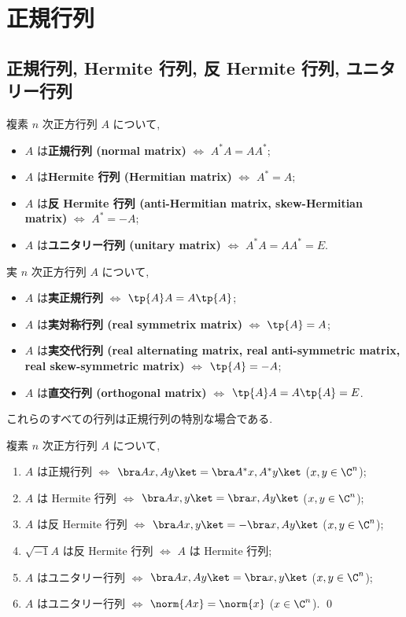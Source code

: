 \documentclass[12pt,twoside]{jarticle}
\begin{document}
\section{正規行列}
\label{sec:normal-matrix}


\subsection{正規行列, Hermite 行列, 反 Hermite 行列, ユニタリー行列}


複素 $n$ 次正方行列 $A$ について, 
\begin{itemize}
\item $A$ は{\bf 正規行列 (normal matrix)} $\iff$ $A^*A=AA^*$;
\item $A$ は{\bf  Hermite 行列 (Hermitian matrix)} $\iff$ $A^*=A$;
\item $A$ は{\bf 反 Hermite 行列 (anti-Hermitian matrix, skew-Hermitian
    matrix)} $\iff$ $A^* = -A$;
\item $A$ は{\bf ユニタリー行列 (unitary matrix)} $\iff$ 
  $A^*A = AA^* = E$.
\end{itemize}
実 $n$ 次正方行列 $A$ について,
\begin{itemize}
\item $A$ は{\bf 実正規行列} $\iff$ $\tp{A}A=A\tp{A}$; 
\item $A$ は{\bf 実対称行列 (real symmetrix matrix)} $\iff$
  $\tp{A}=A$; 
\item $A$ は{\bf 実交代行列 (real alternating matrix, real anti-symmetric 
    matrix, real skew-symmetric matrix)} $\iff$ $\tp{A}=-A$;
\item $A$ は{\bf 直交行列 (orthogonal matrix)} $\iff$
  $\tp{A}A=A\tp{A}=E$. 
\end{itemize}
これらのすべての行列は正規行列の特別な場合である. 


\begin{question}
\label{q:normal-matrix-misc}
  複素 $n$ 次正方行列 $A$ について, 
  \begin{enumerate}
  \item $A$ は正規行列 $\iff$ 
    $\bra Ax,Ay\ket = \bra A^*x,A^*y\ket$ \quad ($x,y\in\C^n$);
  \item $A$ は Hermite 行列 $\iff$ 
    $\bra Ax,y\ket = \bra x,Ay\ket$ \quad ($x,y\in\C^n$);
  \item $A$ は反 Hermite 行列 $\iff$ 
    $\bra Ax,y\ket = - \bra x,Ay\ket$ \quad ($x,y\in\C^n$);
  \item $\sqrt{-1}A$ は反 Hermite 行列 $\iff$ $A$ は Hermite 行列;
  \item $A$ はユニタリー行列 $\iff$ 
    $\bra Ax,Ay\ket = \bra x,y\ket$ \quad ($x,y\in\C^n$);
  \item $A$ はユニタリー行列 $\iff$ 
    $\norm{Ax} = \norm{x}$ \quad ($x\in\C^n$).
    \qed
  \end{enumerate}
\end{question}
\end{document}
